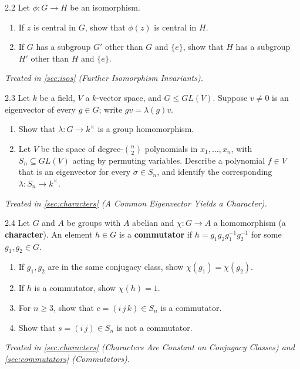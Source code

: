 \documentclass[11pt]{report}
\begin{document}
\begin{hwbox}{2.2}\label{hw:2.2}
Let $\phi: G \to H$ be an isomorphism.
\begin{enumerate}
    \item If $z$ is central in $G$, show that $\phi(z)$ is central in $H$.
    \item If $G$ has a subgroup $G'$ other than $G$ and $\{e\}$, show that $H$ has a subgroup $H'$ other than $H$ and $\{e\}$.
\end{enumerate}
\end{hwbox}
\textit{Treated in \ref{sec:isos} (Further Isomorphism Invariants).}

\begin{hwbox}{2.3}\label{hw:2.3}
Let $k$ be a field, $V$ a $k$-vector space, and $G \leq GL(V)$. Suppose $v \neq 0$ is an eigenvector of every $g \in G$; write $gv = \lambda(g)v$.
\begin{enumerate}
    \item Show that $\lambda: G \to k^\times$ is a group homomorphism.
    \item Let $V$ be the space of degree-$\binom{n}{2}$ polynomials in $x_1, \ldots, x_n$, with $S_n \subseteq GL(V)$ acting by permuting variables. Describe a polynomial $f \in V$ that is an eigenvector for every $\sigma \in S_n$, and identify the corresponding $\lambda: S_n \to k^\times$.
\end{enumerate}
\end{hwbox}
\textit{Treated in \ref{sec:characters} (A Common Eigenvector Yields a Character).}

\begin{hwbox}{2.4}\label{hw:2.4}
Let $G$ and $A$ be groups with $A$ abelian and $\chi: G \to A$ a homomorphism (a \textbf{character}). An element $h \in G$ is a \textbf{commutator} if $h = g_1g_2g_1^{-1}g_2^{-1}$ for some $g_1, g_2 \in G$.
\begin{enumerate}
    \item If $g_1, g_2$ are in the same conjugacy class, show $\chi(g_1) = \chi(g_2)$.
    \item If $h$ is a commutator, show $\chi(h) = 1$.
    \item For $n \geq 3$, show that $c = (i\,j\,k) \in S_n$ is a commutator.
    \item Show that $s = (i\,j) \in S_n$ is not a commutator.
\end{enumerate}
\end{hwbox}
\textit{Treated in \ref{sec:characters} (Characters Are Constant on Conjugacy Classes) and \ref{sec:commutators} (Commutators).}
\end{document}
